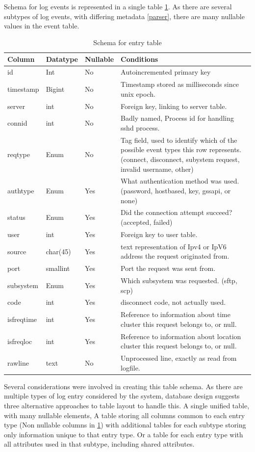 Schema for log events is represented in a single table \ref{entry_schema}. As there are several subtypes of log events, with differing metadata \ref{parser}, there are many nullable values in the event table.
\begin{table}[tbh]
\centering
\begin{tabular}{l || l | l | p{}}
Column & Datatype & Nullable & Conditions \\ \hline
id & Int & No & Autoincremented primary key \\
timestamp & Bigint & No & Timestamp stored as milliseconds since unix epoch. \\
server & int & No & Foreign key, linking to server table. \\
connid & int & No & Badly named, Process id for handling sshd process. \\
reqtype & Enum & No & Tag field, used to identify which of the possible event types this row represents. (connect, disconnect, subystem request, invalid username, other) \\
authtype & Enum & Yes & What authentication method was used. (password, hostbased, key, gssapi, or none) \\
status & Enum & Yes & Did the connection attempt succeed? (accepted, failed) \\
user & int & Yes & Foreign key to user table. \\
source & char(45) & Yes & text representation of Ipv4 or IpV6 address the request originated from. \\
port & smallint & Yes & Port the request was sent from. \\
subsystem & Enum & Yes & Which subsystem was requested. (sftp, scp) \\
code & int & Yes & disconnect code, not actually used. \\
isfreqtime & int & Yes & Reference to information about time cluster this request belongs to, or null. \\
isfreqloc & int & Yes & Reference to information about location cluster this request belongs to, or null. \\
rawline & text & No & Unprocessed line, exactly as read from logfile. \\
\end {tabular}
\caption{Schema for entry table}
\label{entry_schema}
\end{table}

Several considerations were involved in creating this table schema. As there are multiple types of log entry considered by the system, database design suggests three alternative approaches to table layout to handle this. A single unified table, with many nullable elements, A table storing all columns common to each entry type (Non nullable columns in \ref{entry_schema}) with additional tables for each subtype storing only information unique to that entry type. Or a table for each entry type with all attributes used in that subtype, including shared attributes.

